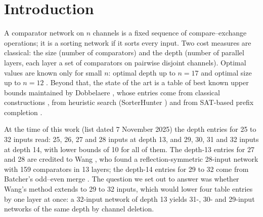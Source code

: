 \documentclass[11pt,a4paper]{article}
\theoremstyle{plain}
\theoremstyle{definition}
\theoremstyle{remark}
\begin{document}
\section{Introduction}

A comparator network on $n$ channels is a fixed sequence of compare--exchange operations; it is a sorting network if it sorts every input. Two cost measures are classical: the size (number of comparators) and the depth (number of parallel layers, each layer a set of comparators on pairwise disjoint channels). Optimal values are known only for small $n$: optimal depth up to $n=17$ \cite{BZ14,CCEMS19} and optimal size up to $n=12$ \cite{Harder20}. Beyond that, the state of the art is a table of best known upper bounds maintained by Dobbelaere \cite{Dobb}, whose entries come from classical constructions \cite{Batcher68,Knuth}, from heuristic search (SorterHunter \cite{SorterHunter}) and from SAT-based prefix completion \cite{Ehlers17,Wang25}.

At the time of this work (list dated 7 November 2025) the depth entries for 25 to 32 inputs read: 25, 26, 27 and 28 inputs at depth 13, and 29, 30, 31 and 32 inputs at depth 14, with lower bounds of 10 for all of them. The depth-13 entries for 27 and 28 are credited to Wang \cite{Wang25}, who found a reflection-symmetric 28-input network with 159 comparators in 13 layers; the depth-14 entries for 29 to 32 come from Batcher's odd--even merge \cite{Batcher68}. The question we set out to answer was whether Wang's method extends to 29 to 32 inputs, which would lower four table entries by one layer at once: a 32-input network of depth 13 yields 31-, 30- and 29-input networks of the same depth by channel deletion.
\end{document}

